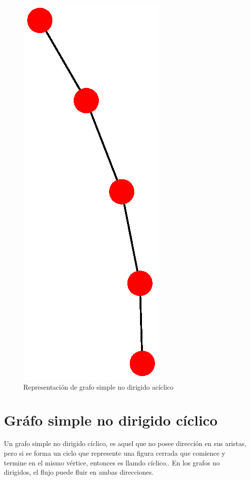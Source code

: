 \documentclass{article}
\begin{document}
\begin{figure}
    \centering
    \includegraphics[scale=0.4]{imagenes/Fig01.eps}
    \caption{Representación de grafo simple no dirigido acíclico}
    \label{fig:Fig01}
\end{figure}

\section{Gráfo simple no dirigido cíclico}

Un grafo simple no dirigido cíclico, es aquel que no posee dirección en sus aristas, pero si se forma un ciclo que represente una figura cerrada que comience y termine en el mismo vértice, entonces es llamdo cíclico.\cite{redes}. En los grafos no dirigidos, el flujo puede fluir en ambas direcciones.
\end{document}
